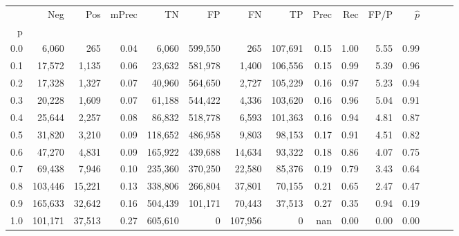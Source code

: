 \begin{tabular}{rrrrrrrrrrrrrrr}
\toprule
{} &      Neg &     Pos & mPrec &       TN &       FP &       FN &       TP &  Prec &   Rec &  FP/P & $\hat{p}$ \\
p   &          &         &       &          &          &          &          &       &       &       &           \\
\midrule
0.0 &    6,060 &     265 &  0.04 &    6,060 &  599,550 &      265 &  107,691 &  0.15 &  1.00 &  5.55 &      0.99 \\
0.1 &   17,572 &   1,135 &  0.06 &   23,632 &  581,978 &    1,400 &  106,556 &  0.15 &  0.99 &  5.39 &      0.96 \\
0.2 &   17,328 &   1,327 &  0.07 &   40,960 &  564,650 &    2,727 &  105,229 &  0.16 &  0.97 &  5.23 &      0.94 \\
0.3 &   20,228 &   1,609 &  0.07 &   61,188 &  544,422 &    4,336 &  103,620 &  0.16 &  0.96 &  5.04 &      0.91 \\
0.4 &   25,644 &   2,257 &  0.08 &   86,832 &  518,778 &    6,593 &  101,363 &  0.16 &  0.94 &  4.81 &      0.87 \\
0.5 &   31,820 &   3,210 &  0.09 &  118,652 &  486,958 &    9,803 &   98,153 &  0.17 &  0.91 &  4.51 &      0.82 \\
0.6 &   47,270 &   4,831 &  0.09 &  165,922 &  439,688 &   14,634 &   93,322 &  0.18 &  0.86 &  4.07 &      0.75 \\
0.7 &   69,438 &   7,946 &  0.10 &  235,360 &  370,250 &   22,580 &   85,376 &  0.19 &  0.79 &  3.43 &      0.64 \\
0.8 &  103,446 &  15,221 &  0.13 &  338,806 &  266,804 &   37,801 &   70,155 &  0.21 &  0.65 &  2.47 &      0.47 \\
0.9 &  165,633 &  32,642 &  0.16 &  504,439 &  101,171 &   70,443 &   37,513 &  0.27 &  0.35 &  0.94 &      0.19 \\
1.0 &  101,171 &  37,513 &  0.27 &  605,610 &        0 &  107,956 &        0 &   nan &  0.00 &  0.00 &      0.00 \\
\bottomrule
\end{tabular}
